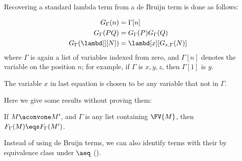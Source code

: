 \documentclass[../../../include/open-logic-section]{subfiles}
\begin{document}
Recovering a standard lambda term from a de Bruijn term is done as
follows:

\begin{defn}
  \begin{align*}
    G_\Gamma(n) &= \Gamma[n] \\
    G_\Gamma(PQ) &= G_\Gamma(P) G_\Gamma(Q) \\
    G_\Gamma(\lambd[][N]) &= \lambd[x][G_{x,\Gamma}(N)]
  \end{align*}
  where $\Gamma$ is again a list of variables indexed from zero, and
  $\Gamma[n]$ denotes the variable on the position $n$; for example,
  if $\Gamma$ is $x,y,z$, then $\Gamma[1]$ is $y$.

  The variable $x$ in last equation is chosen to be any variable that
  not in $\Gamma$.
\end{defn}

Here we give some results without proving them:

\begin{prop}
  If $M \aconvone M'$, and $\Gamma$ is any list containing $\FV{M}$, then
  $F_\Gamma(M) \eqs F_\Gamma(M')$.
\end{prop}

Instead of using de Bruijn terms, we can also identify terms with their
by equivalence class under $\aeq$ ().
\end{document}

